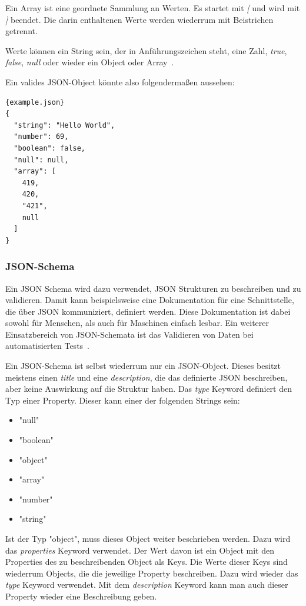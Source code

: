 Ein Array ist eine geordnete Sammlung an Werten.
 Es startet mit \textit{[} und wird mit \textit{]} beendet.
 Die darin enthaltenen Werte werden wiederrum mit Beistrichen getrennt.

 Werte können ein String sein, der in Anführungszeichen steht, eine Zahl, \textit{true}, \textit{false}, \textit{null}
 oder wieder ein Object oder Array~\cite{json}.

 Ein valides JSON-Object könnte also folgendermaßen aussehen:

 \label{json-example}
 \begin{lstlisting}[label={lst:example.jsom}]{example.json}
{
  "string": "Hello World",
  "number": 69,
  "boolean": false,
  "null": null,
  "array": [
    419,
    420,
    "421",
    null
  ]
}
 \end{lstlisting}

 \subsubsection{JSON-Schema}
Ein JSON Schema wird dazu verwendet, JSON Strukturen zu beschreiben und zu validieren.
Damit kann beispielsweise eine Dokumentation für eine Schnittstelle, die über JSON kommuniziert, definiert werden.
Diese Dokumentation ist dabei sowohl für Menschen, als auch für Maschinen einfach lesbar.
Ein weiterer Einsatzbereich von JSON-Schemata ist das Validieren von Daten bei automatisierten Tests~\cite{json-schema}.

 Ein JSON-Schema ist selbst wiederrum nur ein JSON-Object.
 Dieses besitzt meistens einen \textit{title} und eine \textit{description}, die das definierte JSON beschreiben,
 aber keine Auswirkung auf die Struktur haben.
 Das \textit{type} Keyword definiert den Typ einer Property.
 Dieser kann einer der folgenden Strings sein:

\begin{itemize}
  \item "null"
  \item "boolean"
  \item "object"
  \item "array"
  \item "number"
  \item "string"
\end{itemize}

 Ist der Typ "object", muss dieses Object weiter beschrieben werden.
 Dazu wird das \textit{properties} Keyword verwendet.
 Der Wert davon ist ein Object mit den Properties des zu beschreibenden Object als Keys.
 Die Werte dieser Keys sind wiederrum Objects, die die jeweilige Property beschreiben.
 Dazu wird wieder das \textit{type} Keyword verwendet.
 Mit dem \textit{description} Keyword kann man auch dieser Property wieder eine Beschreibung geben.

